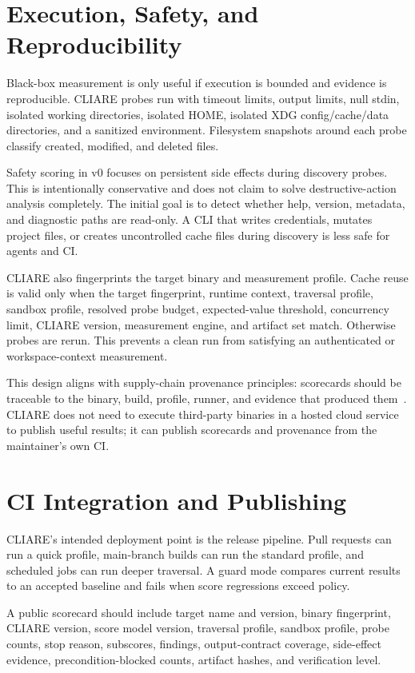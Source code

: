 \documentclass[11pt]{article}
\begin{document}
\section{Execution, Safety, and Reproducibility}

Black-box measurement is only useful if execution is bounded and evidence is reproducible. CLIARE probes run with timeout limits, output limits, null stdin, isolated working directories, isolated HOME, isolated XDG config/cache/data directories, and a sanitized environment. Filesystem snapshots around each probe classify created, modified, and deleted files.

Safety scoring in v0 focuses on persistent side effects during discovery probes. This is intentionally conservative and does not claim to solve destructive-action analysis completely. The initial goal is to detect whether help, version, metadata, and diagnostic paths are read-only. A CLI that writes credentials, mutates project files, or creates uncontrolled cache files during discovery is less safe for agents and CI.

CLIARE also fingerprints the target binary and measurement profile. Cache reuse is valid only when the target fingerprint, runtime context, traversal profile, sandbox profile, resolved probe budget, expected-value threshold, concurrency limit, CLIARE version, measurement engine, and artifact set match. Otherwise probes are rerun. This prevents a clean run from satisfying an authenticated or workspace-context measurement.

This design aligns with supply-chain provenance principles: scorecards should be traceable to the binary, build, profile, runner, and evidence that produced them~\cite{slsa-provenance}. CLIARE does not need to execute third-party binaries in a hosted cloud service to publish useful results; it can publish scorecards and provenance from the maintainer's own CI.

\section{CI Integration and Publishing}

CLIARE's intended deployment point is the release pipeline. Pull requests can run a quick profile, main-branch builds can run the standard profile, and scheduled jobs can run deeper traversal. A guard mode compares current results to an accepted baseline and fails when score regressions exceed policy.

A public scorecard should include target name and version, binary fingerprint, CLIARE version, score model version, traversal profile, sandbox profile, probe counts, stop reason, subscores, findings, output-contract coverage, side-effect evidence, precondition-blocked counts, artifact hashes, and verification level.
\end{document}
